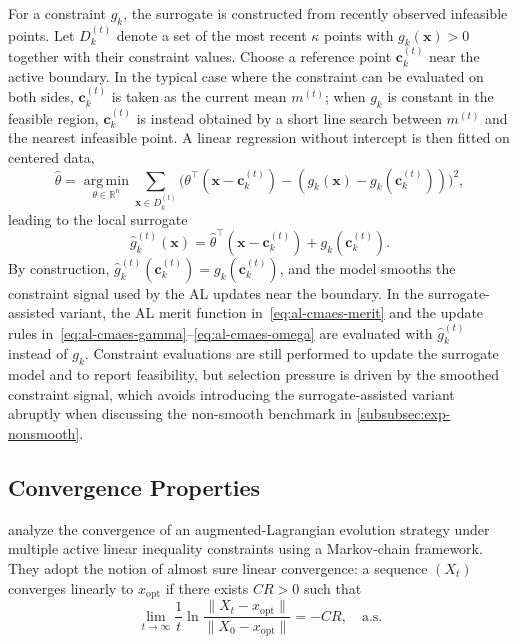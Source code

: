 \documentclass[11pt,a4paper]{article}
\numberwithin{equation}{section}
\numberwithin{figure}{section}
\numberwithin{table}{section}
\theoremstyle{definition}
\newcommand{\R}{\mathbb{R}}
\newcommand{\argmin}{\operatorname*{arg\,min}}
\begin{document}
For a constraint $g_k$, the surrogate is constructed from recently observed infeasible points. Let $D_k^{(t)}$ denote a set of the most recent $\kappa$ points with $g_k(\bm{x})>0$ together with their constraint values. Choose a reference point $\bm{c}_k^{(t)}$ near the active boundary. In the typical case where the constraint can be evaluated on both sides, $\bm{c}_k^{(t)}$ is taken as the current mean $m^{(t)}$; when $g_k$ is constant in the feasible region, $\bm{c}_k^{(t)}$ is instead obtained by a short line search between $m^{(t)}$ and the nearest infeasible point.\cite{DufosseHansen} A linear regression without intercept is then fitted on centered data,
\begin{equation}
  \label{eq:surrogate-fit}
  \hat{\theta}
  =
  \argmin_{\theta\in\R^n}
  \sum_{\bm{x}\in D_k^{(t)}}
  \bigl(\theta^\top(\bm{x}-\bm{c}_k^{(t)}) - (g_k(\bm{x})-g_k(\bm{c}_k^{(t)}))\bigr)^2,
\end{equation}
leading to the local surrogate
\begin{equation}
  \label{eq:surrogate-def}
  \hat{g}_k^{(t)}(\bm{x})
  =
  \hat{\theta}^\top(\bm{x}-\bm{c}_k^{(t)}) + g_k(\bm{c}_k^{(t)}).
\end{equation}
By construction, $\hat{g}_k^{(t)}(\bm{c}_k^{(t)})=g_k(\bm{c}_k^{(t)})$, and the model smooths the constraint signal used by the AL updates near the boundary. In the surrogate-assisted variant, the AL merit function in~\eqref{eq:al-cmaes-merit} and the update rules in~\eqref{eq:al-cmaes-gamma}--\eqref{eq:al-cmaes-omega} are evaluated with $\hat{g}_k^{(t)}$ instead of $g_k$.\cite{DufosseHansen} Constraint evaluations are still performed to update the surrogate model and to report feasibility, but selection pressure is driven by the smoothed constraint signal, which avoids introducing the surrogate-assisted variant abruptly when discussing the non-smooth benchmark in \cref{subsubsec:exp-nonsmooth}.

\subsection{Convergence Properties}

\cite{Atamna2017} analyze the convergence of an augmented-Lagrangian evolution strategy
under multiple active linear inequality constraints using a Markov-chain framework.
They adopt the notion of almost sure linear convergence:
a sequence $(X_t)$ converges linearly to $x_{\mathrm{opt}}$ if there exists $CR>0$ such that
\begin{equation}
\lim_{t\to\infty}\frac{1}{t}
\ln\frac{\|X_t-x_{\mathrm{opt}}\|}{\|X_0-x_{\mathrm{opt}}\|}
=-CR,
\quad \text{a.s.}
\tag{2.6}
\end{equation}
\end{document}
